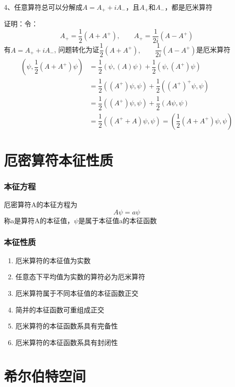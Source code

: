 \begin{frame} [allowframebreaks=]
    \frametitle{}
    \begin{exampleblock}{}
        4、任意算符总可以分解成$A=A_+ +iA_-$，且$A_+$和$A_-$，都是厄米算符
    \end{exampleblock}
    \alert{证明：}令：
    $$A_+=\dfrac{1}{2} (A+A^+), \qquad A_+=\dfrac{1}{2i} (A-A^+) $$
    有$A=A_+ +iA_-$, 问题转化为证$\dfrac{1}{2} (A+A^+), \qquad \dfrac{1}{2i} (A-A^+) $是厄米算符\\
    \begin{equation*}
        \begin{split}
            (\psi, \dfrac{1}{2} (A+A^+)\psi ) &=\dfrac{1}{2}(\psi, (A)\psi) + \dfrac{1}{2}(\psi, (A^+)\psi) \\
            &= \dfrac{1}{2}((A^+)\psi, \psi) + \dfrac{1}{2}((A^+)^+\psi, \psi) \\
            &= \dfrac{1}{2}((A^+)\psi, \psi) + \dfrac{1}{2}(A\psi, \psi) \\
            &= \dfrac{1}{2}( (A^+ + A) \psi, \psi ) =( \dfrac{1}{2}(A+A^+) \psi, \psi ) 
         \end{split}
    \end{equation*}  
\end{frame} 

\section{厄密算符本征性质}

\begin{frame}
    \frametitle{本征方程}
    厄密算符A的本征方程为
    $$ A\psi=a \psi $$
    称a是算符A的本征值，$\psi$是属于本征值a的本征函数
\end{frame} 

\begin{frame}
    \frametitle{本征性质}
    \begin{enumerate}
        \item 厄米算符的本征值为实数
        \item 任意态下平均值为实数的算符必为厄米算符
        \item 厄米算符属于不同本征值的本征函数正交
        \item 简并的本征函数可重组成正交
        \item 厄米算符的本征函数系具有完备性
        \item 厄米算符的本征函数系具有封闭性
    \end{enumerate}
\end{frame} 


\section{希尔伯特空间}